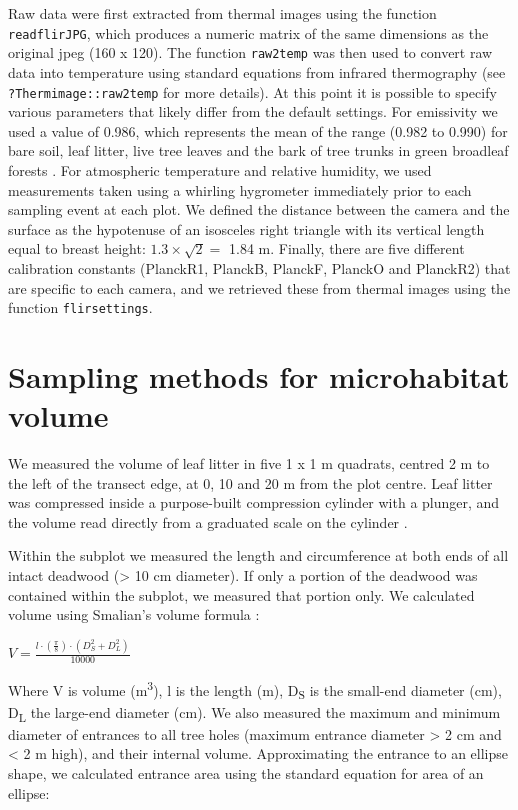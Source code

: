 \documentclass[12pt,a4paper,]{report}
\theoremstyle{definition}
\theoremstyle{definition}
\theoremstyle{definition}
\theoremstyle{remark}
\begin{document}
Raw data were first extracted from thermal images using the function
\texttt{readflirJPG}, which produces a numeric matrix of the same
dimensions as the original jpeg (160 x 120). The function
\texttt{raw2temp} was then used to convert raw data into temperature
using standard equations from infrared thermography (see
\texttt{?Thermimage::raw2temp} for more details). At this point it is
possible to specify various parameters that likely differ from the
default settings. For emissivity we used a value of 0.986, which
represents the mean of the range (0.982 to 0.990) for bare soil, leaf
litter, live tree leaves and the bark of tree trunks in green broadleaf
forests \citep{snyder_classification-based_1998}. For atmospheric
temperature and relative humidity, we used measurements taken using a
whirling hygrometer immediately prior to each sampling event at each
plot. We defined the distance between the camera and the surface as the
hypotenuse of an isosceles right triangle with its vertical length equal
to breast height: \(1.3\times\sqrt{2} =\) 1.84 m. Finally, there are
five different calibration constants (PlanckR1, PlanckB, PlanckF,
PlanckO and PlanckR2) that are specific to each camera, and we retrieved
these from thermal images using the function \texttt{flirsettings}.

\pagebreak

\section{Sampling methods for microhabitat volume}\label{text-B-3}

We measured the volume of leaf litter in five 1 x 1 m quadrats, centred
2 m to the left of the transect edge, at 0, 10 and 20 m from the plot
centre. Leaf litter was compressed inside a purpose-built compression
cylinder with a plunger, and the volume read directly from a graduated
scale on the cylinder \citep{parsons_volume_2009}.

Within the subplot we measured the length and circumference at both ends
of all intact deadwood (\textgreater{} 10 cm diameter). If only a
portion of the deadwood was contained within the subplot, we measured
that portion only. We calculated volume using Smalian's volume formula
\citep{waddell_sampling_2002}:

\begin{center}
$V = \frac{l \cdot (\frac{\pi}{8}) \cdot (D_S^2 + D_L^2)}{10000}$
\end{center}

Where V is volume (m\textsuperscript{3}), l is the length (m),
D\textsubscript{S} is the small-end diameter (cm), D\textsubscript{L}
the large-end diameter (cm). We also measured the maximum and minimum
diameter of entrances to all tree holes (maximum entrance diameter
\textgreater{} 2 cm and \textless{} 2 m high), and their internal
volume. Approximating the entrance to an ellipse shape, we calculated
entrance area using the standard equation for area of an ellipse:
\end{document}
